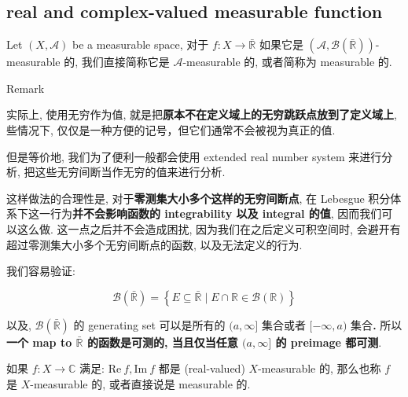 \subsection{real and complex-valued measurable function}\label{real-and-complex-valued-measurable-function}

\begin{definition}{}

Let \((X,\mathcal{A})\) be a measurable space, 对于 \(f:X\rightarrow\bar{\mathbb{R}}\) 如果它是 \((\mathcal{A},\mathcal{B}(\bar{\mathbb{R}}))\)-measurable 的, 我们直接简称它是 \(\mathcal{A}\)-measurable 的, 或者简称为 measurable 的.

\end{definition}

\begin{qlremark}{Remark}

实际上, 使用无穷作为值, 就是把\textbf{原本不在定义域上的无穷跳跃点放到了定义域上}, 些情况下, 仅仅是一种方便的记号，但它们通常不会被视为真正的值.

但是等价地, 我们为了便利一般都会使用 extended real number system 来进行分析, 把这些无穷间断当作无穷的值来进行分析.

这样做法的合理性是, 对于\textbf{零测集大小多个这样的无穷间断点}, 在 Lebesgue 积分体系下这一行为\textbf{并不会影响函数的 integrability 以及 integral 的值}, 因而我们可以这么做. 这一点之后并不会造成困扰, 因为我们在之后定义可积空间时, 会避开有超过零测集大小多个无穷间断点的函数, 以及无法定义的行为.

我们容易验证:

\[\mathcal{B}(\bar{\mathbb{R}}) = \left\{ {E \subseteq \bar{\mathbb{R}} \mid E \cap \mathbb{R} \in \mathcal{B}(\mathbb{R})} \right\}\]

以及, \(\mathcal{B}(\bar{\mathbb{R}})\) 的 generating set 可以是所有的 \((a,\infty\rbrack\) 集合或者 \(\lbrack - \infty,a)\) 集合\textbf{.} 所以\textbf{一个 map to \(\bar{\mathbb{R}}\) 的函数是可测的, 当且仅当任意 \((a,\infty\rbrack\) 的 preimage 都可测}.\\

\end{qlremark}

\begin{definition}{}

如果 \(f:X\rightarrow\mathbb{C}\) 满足: \(\text{Re}\ f,\text{Im}\ f\) 都是 (real-valued) \(X\)-measurable 的, 那么也称 \(f\) 是 \(X\)-measurable 的, 或者直接说是 measurable 的.

\end{definition}

